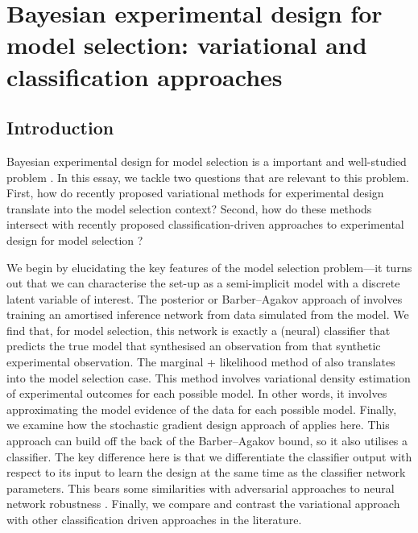 \documentclass[a4paper, 10pt]{report}
\theoremstyle{plain}
\begin{document}
	
	
	\section{Bayesian experimental design for model selection: variational and classification approaches}
	\label{sec:modelselection}
	
	\subsection{Introduction}
	Bayesian experimental design for model selection is a important and well-studied problem \citep{cavagnaro2010adaptive,vanlier2014optimal,hainy2018optimal}.
	In this essay, we tackle two questions that are relevant to this problem. First, how do recently proposed variational methods for experimental design \citep{foster2019variational,foster2020unified} translate into the model selection context? 
	Second, how do these methods intersect with recently proposed classification-driven approaches to experimental design for model selection \citep{hainy2018optimal}?
	
	We begin by elucidating the key features of the model selection problem---it turns out that we can characterise the set-up as a semi-implicit model with a discrete latent variable of interest.
	The posterior or Barber--Agakov approach of \citet{foster2019variational} involves training an amortised inference network from data simulated from the model. We find that, for model selection, this network is exactly a (neural) classifier that predicts the true model that synthesised an observation from that synthetic experimental observation.
	The marginal + likelihood method of \citet{foster2019variational} also translates into the model selection case. 
	This method involves variational density estimation of experimental outcomes for each possible model.
	In other words, it involves approximating the model evidence of the data for each possible model.
	Finally, we examine how the stochastic gradient design approach of \citet{foster2020unified} applies here.
	This approach can build off the back of the Barber--Agakov bound, so it also utilises a classifier.
	The key difference here is that we differentiate the classifier output with respect to its input to learn the design at the same time as the classifier network parameters. This bears some similarities with adversarial approaches to neural network robustness \citep{carlini2019evaluating}.
	Finally, we compare and contrast the variational approach with other classification driven approaches in the literature.
	
\end{document}
